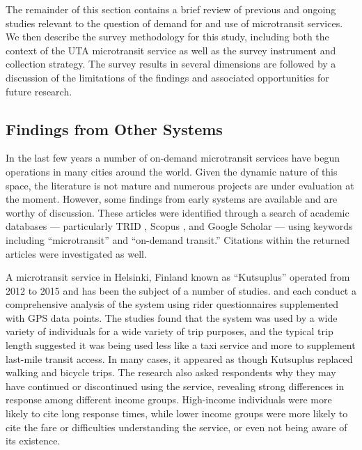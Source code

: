 \documentclass[smartcities,article,submit,moreauthors,pdftex]{mdpi}
\begin{document}
The remainder of this section contains a brief review of previous and ongoing
studies relevant to the question of demand for and use of microtransit services.
We then describe the survey methodology for this study, including both the
context of the UTA microtransit service as well as the survey instrument and
collection strategy. The survey results in several dimensions are followed by a
discussion of the limitations of the findings and associated opportunities for
future research.

\hypertarget{findings-from-other-systems}{%
\subsection{Findings from Other Systems}\label{findings-from-other-systems}}

In the last few years a number of on-demand microtransit services have begun
operations in many cities around the world. Given the dynamic nature of this
space, the literature is not mature and numerous projects are under evaluation
at the moment. However, some findings from early systems are available and are
worthy of discussion. These articles were identified through a search of
academic databases --- particularly TRID \citep{trid}, Scopus \citep{scopus},
and Google Scholar \citep{googlescholar} --- using
keywords including ``microtransit'' and ``on-demand transit.'' Citations within
the returned articles were investigated as well.

A microtransit service in Helsinki, Finland known as ``Kutsuplus'' operated from
2012 to 2015 and has been the subject of a number of studies. \citet{weckstrom2018} and
\citet{Haglund2019} each conduct a comprehensive analysis of the system using rider
questionnaires supplemented with GPS data points. The studies found that the
system was used by a wide variety of individuals for a wide variety of trip
purposes, and the typical trip length suggested it was being used less like a
taxi service and more to supplement last-mile transit access. In many cases, it
appeared as though Kutsuplus replaced walking and bicycle trips. The
\citet{weckstrom2018} research also asked respondents why they may have continued or
discontinued using the service, revealing strong differences in response among
different income groups. High-income individuals were more likely to cite long
response times, while lower income groups were more likely to cite the fare or
difficulties understanding the service, or even not being aware of its
existence.
\end{document}
